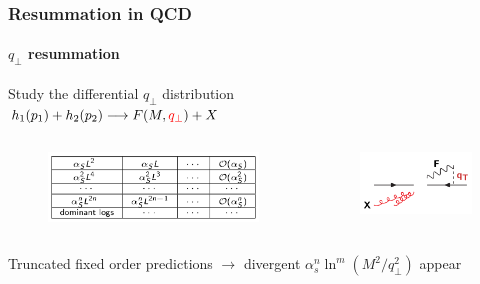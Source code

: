 \documentclass[aspectratio=43]{beamer}
\begin{document}
\begin{frame}

	\frametitle{Resummation in QCD}
	\framesubtitle{$q_{\perp}$ resummation}
	
	\center	Study the differential $q_{\perp}$ distribution \\
	\center	$h_{1}(p_{1}) + h_{2}(p_{2}) \longrightarrow F(M, {\color{red}q_{\perp}}) + X$
	
	\begin{columns}
	

	\begin{figure}
		\includegraphics[width = 7.5cm]{plots/qT_logs_table.png}
	\end{figure}

	
	\begin{figure}
		\includegraphics[width = 4cm]{plots/qT_diagram.png}
	\end{figure}

	\end{columns}

	\vspace{0.5 cm}

	Truncated fixed order predictions $\rightarrow$ {\color{red}divergent $\alpha_{s}^{n}\ln^{m}(M^{2}/q_{\perp}^{2})$ appear}

\end{frame}
\end{document}

